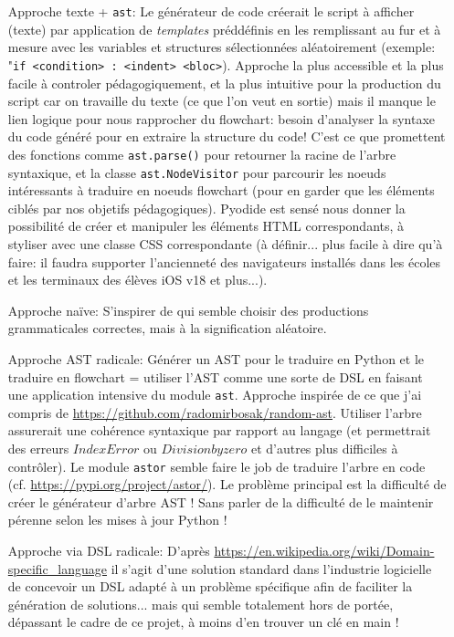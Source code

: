 \documentclass[11pt,a4paper]{article}
\begin{document}
\begin{enumerate}
    \item[Approche texte + \texttt{ast}:] Le générateur de code créerait le script à afficher (texte) par application de \textit{templates} préddéfinis en les remplissant au fur et à mesure avec les variables et structures sélectionnées aléatoirement (exemple: "\texttt{if <condition> : <indent> <bloc>}). Approche la plus accessible et la plus facile à controler pédagogiquement, et la plus intuitive pour la production du script car on travaille du texte (ce que l'on veut en sortie) mais il manque le lien logique pour nous rapprocher du flowchart: besoin d'analyser la syntaxe du code généré pour en extraire la structure du code! C'est ce que promettent des fonctions comme \texttt{ast.parse()} pour retourner la racine de l'arbre syntaxique, et la classe \texttt{ast.NodeVisitor} pour parcourir les noeuds intéressants à traduire en noeuds flowchart (pour en garder que les éléments ciblés par nos objetifs pédagogiques). Pyodide est sensé nous donner la possibilité de créer et manipuler les éléments HTML correspondants, à styliser avec une classe CSS correspondante (à définir... plus facile à dire qu'à faire: il faudra supporter l'ancienneté des navigateurs installés dans les écoles et les terminaux des élèves iOS v18 et plus...).
     
     \item[Approche naïve:] S'inspirer de \cite{fuzzingbook} qui semble choisir des productions grammaticales correctes, mais à la signification aléatoire. 

     \item [Approche AST radicale:] Générer un AST pour le traduire en Python et le traduire en flowchart = utiliser l'AST comme une sorte de DSL en faisant une application intensive du module \texttt{ast}. Approche inspirée de ce que j'ai compris de \url{https://github.com/radomirbosak/random-ast}. Utiliser l'arbre assurerait une cohérence syntaxique par rapport au langage (et permettrait des erreurs $Index Error$ ou $Division by zero$ et d'autres plus difficiles à contrôler). Le module \texttt{astor} semble faire le job de traduire l'arbre en code (cf. \url{https://pypi.org/project/astor/}). Le problème principal est la difficulté de créer le générateur d'arbre AST ! Sans parler de la difficulté de le maintenir pérenne selon les mises à jour Python !
     
    \item[Approche via DSL radicale:] D'après \url{https://en.wikipedia.org/wiki/Domain-specific_language} il s'agit d'une solution standard dans l'industrie logicielle de concevoir un DSL adapté à un problème spécifique afin de faciliter la génération de solutions... mais qui semble totalement hors de portée, dépassant le cadre de ce projet, à moins d'en trouver un clé en main !
    
\end{enumerate}
\end{document}
